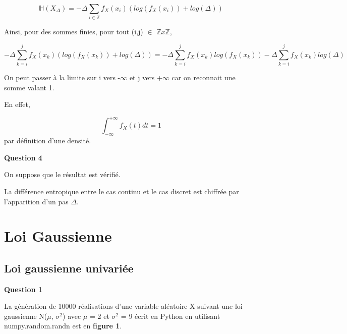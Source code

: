 \documentclass{article}
\begin{document}
$$ \mathbb{H}(X_{\Delta}) = - \Delta \sum_{i\in\mathbb{Z}} f_X(x_i)( log(f_X(x_i)) + log(\Delta) ) $$

\vspace{\baselineskip}

Ainsi, pour des sommes finies,  pour tout (i,j) $\in$ $\mathbb{Z}x\mathbb{Z}$, 

$$ - \Delta \sum_{k=i}^{j} f_X(x_k)( log(f_X(x_k)) + log(\Delta) ) = - \Delta \sum_{k=i}^{j} f_X(x_k)log(f_X(x_k)) - \Delta \sum_{k=i}^{j} f_X(x_k) log(\Delta)  $$

\vspace{2\baselineskip}

On peut passer à la limite sur i vers -$\infty$ et j vers +$\infty$ car on reconnait une somme valant 1.

\vspace{2\baselineskip}

En effet, 

$$ \int_{-\infty}^{+\infty} f_X(t)dt = 1 $$ par définition d'une densité.

\vspace{2\baselineskip}

	\textbf{Question 4}

\vspace{2\baselineskip}

On suppose que le résultat est vérifié.

\vspace{2\baselineskip}

La différence entropique entre le cas continu et le cas discret est chiffrée par l'apparition d'un pas $\Delta$.

\newpage
\section{Loi Gaussienne}
	\subsection{Loi gaussienne univariée}
		\textbf{Question 1}

\vspace{2\baselineskip}

La génération de 10000 réalisations d'une variable aléatoire X suivant une loi gaussienne N($\mu$, $\sigma^2$)
			avec $\mu$ = 2 et $\sigma^2$ = 9 écrit en Python en utilisant numpy.random.randn est en \textbf{figure 1}. 

\vspace{2\baselineskip}
\end{document}
